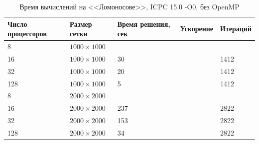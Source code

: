 \documentclass[12pt,notitlepage,oneside]{extarticle}
\begin{document}
\begin{table}[h]
\centering
\caption{Время вычислений на <<Ломоносове>>, ICPC 15.0 -O0, без OpenMP}
\label{lomO0:table}
\begin{tabular}{|l|l|l|l|l|}
\textbf{Число процессоров} & \textbf{Размер сетки} & \textbf{Время решения, сек} & \textbf{Ускорение} & \textbf{Итераций}      \\  \hline
8                          & $1000 \times 1000 $        &                             &                    &                        \\
16                         & $1000 \times 1000 $        & 30                          &                    & 1412                   \\
32                         & $1000 \times 1000 $        & 20                          &                    & 1412                   \\
128                        & $1000 \times 1000 $        & 5                           &                    & 1412                   \\ \hline
8                          & $2000 \times 2000 $        &                             &                    &                        \\
16                         & $2000 \times 2000 $        & 237                         &                    & 2822                   \\
32                         & $2000 \times 2000 $        & 153                         &                    & 2822                   \\
128                        & $2000 \times 2000 $        & 34                          &                    & 2822
\end{tabular}
\end{table}
\end{document}
